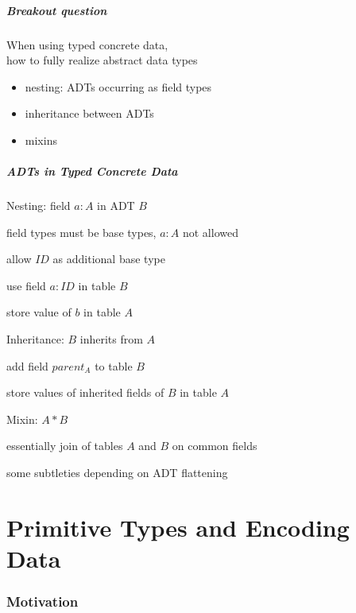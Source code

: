 \begin{frame}\frametitle{Breakout question}
When using typed concrete data,\\
how to fully realize abstract data types
\begin{itemize}
\item nesting: ADTs occurring as field types
\item inheritance between ADTs
\item mixins
\end{itemize}
\end{frame}

\begin{frame}\frametitle{ADTs in Typed Concrete Data}
\begin{blockitems}{Nesting: field $a:A$ in ADT $B$}
\item field types must be base types, $a:A$ not allowed
\item allow $ID$ as additional base type
\item use field $a:ID$ in table $B$
\item store value of $b$ in table $A$
\end{blockitems}

\begin{blockitems}{Inheritance: $B$ inherits from $A$}
\item add field $parent_A$ to table $B$
\item store values of inherited fields of $B$ in table $A$
\end{blockitems}

\begin{blockitems}{Mixin: $A*B$}
\item essentially join of tables $A$ and $B$ on common fields
\item some subtleties depending on ADT flattening
\end{blockitems}
\end{frame}

\part{Primitive Types and Encoding Data}

\section{Motivation}

